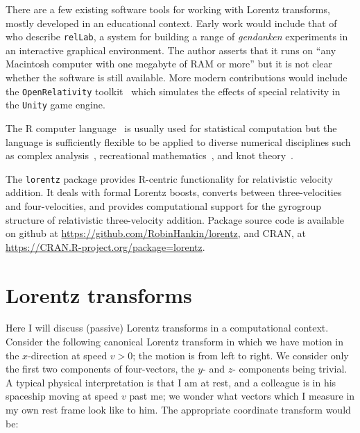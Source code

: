 \documentclass[ijoc,nonblindrev]{informs3} %
\begin{document}
There are a few existing software tools for working with Lorentz
transforms, mostly developed in an educational context.  Early work
would include that of \citet{horwitz1992} who describe {\tt relLab}, a
system for building a range of {\em gendanken} experiments in an
interactive graphical environment.  The author asserts that it runs on
``any Macintosh computer with one megabyte of RAM or more'' but it is
not clear whether the software is still available.  More modern
contributions would include the {\tt OpenRelativity}
toolkit~\citep{sherin2016} which simulates the effects of special
relativity in the {\tt Unity} game engine.

The R computer language~\citep{rcore2020} is usually used for
statistical computation but the language is sufficiently flexible to
be applied to diverse numerical disciplines such as complex
analysis~\citep{hankin2006}, recreational
mathematics~\citep{hankin2005}, and knot theory~\citep{hankin2017}.

The {\tt lorentz} package provides R-centric functionality for
relativistic velocity addition.  It deals with formal Lorentz boosts,
converts between three-velocities and four-velocities, and provides
computational support for the gyrogroup structure of relativistic
three-velocity addition.  Package source code is available on github
at \url{https://github.com/RobinHankin/lorentz}, and CRAN, at
\url{https://CRAN.R-project.org/package=lorentz}.



\section{Lorentz transforms}

\newcommand{\vvec}[2]{\begin{pmatrix}#1 \\ #2\end{pmatrix}}
\newcommand{\twomat}[4]{\begin{pmatrix} #1 & #2 \\ #3 &
    #4\end{pmatrix}}


Here I will discuss (passive) Lorentz transforms in a computational
context.  Consider the following canonical Lorentz transform in which
we have motion in the $x$-direction at speed $v>0$; the motion is from
left to right.  We consider only the first two components of
four-vectors, the $y$- and $z$- components being trivial.  A typical
physical interpretation is that I am at rest, and a colleague is in
his spaceship moving at speed $v$ past me; we wonder what vectors
which I measure in my own rest frame look like to him.  The
appropriate coordinate transform would be:
\end{document}
